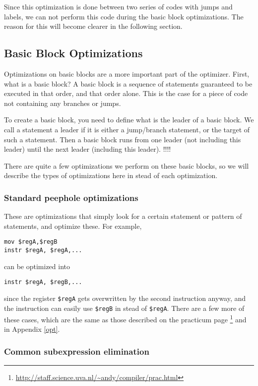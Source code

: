 \documentclass[10pt,a4paper]{article}
\begin{document}
Since this optimization is done between two series of codes with jumps and
labels, we can not perform this code during the basic block optimizations. The
reason for this will become clearer in the following section.

\subsection{Basic Block Optimizations}

Optimizations on basic blocks are a more important part of the optimizer.
First, what is a basic block? A basic block is a sequence of statements
guaranteed to be executed in that order, and that order alone. This is the case
for a piece of code not containing any branches or jumps.

To create a basic block, you need to define what is the leader of a basic
block. We call a statement a leader if it is either a jump/branch statement, or
the target of such a statement. Then a basic block runs from one leader
(not including this leader) until the next leader (including this leader). !!!!

There are quite a few optimizations we perform on these basic blocks, so we
will describe the types of optimizations here in stead of each optimization.

\subsubsection*{Standard peephole optimizations}

These are optimizations that simply look for a certain statement or pattern of
statements, and optimize these. For example,
\begin{verbatim}
mov $regA,$regB
instr $regA, $regA,... 
\end{verbatim}
can be optimized into
\begin{verbatim}
instr $regA, $regB,...
\end{verbatim}
since the register \texttt{\$regA} gets overwritten by the second instruction
anyway, and the instruction can easily use \texttt{\$regB} in stead of
\texttt{\$regA}. There are a few more of these cases, which are the same as
those described on the practicum page
\footnote{\url{http://staff.science.uva.nl/~andy/compiler/prac.html}} and in
Appendix \ref{opt}.

\subsubsection*{Common subexpression elimination}
\end{document}
